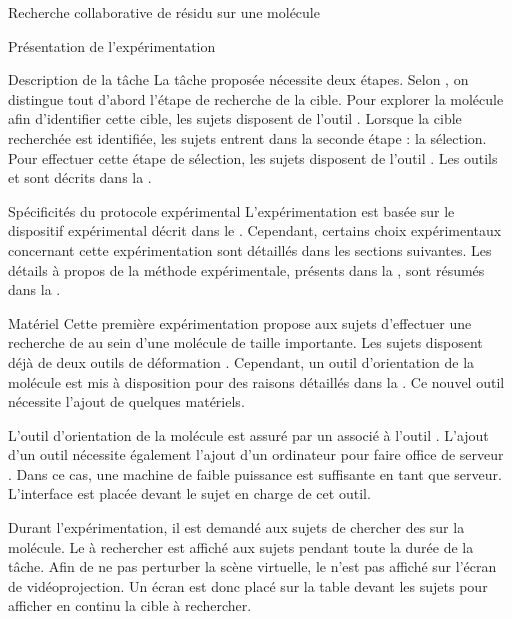 \documentclass[myfrancais]{mythesis}
\begin{document}
\begin{mychapter}{Recherche collaborative de résidu sur une molécule}
\begin{mysection}{Présentation de l'expérimentation}
\begin{mysubsection}{Description de la tâche}
				La tâche proposée nécessite deux étapes.
				Selon , on distingue tout d'abord l'étape de recherche de la cible.
				Pour explorer la molécule afin d'identifier cette cible, les sujets disposent de l'outil .
				Lorsque la cible recherchée est identifiée, les sujets entrent dans la seconde étape : la sélection.
				Pour effectuer cette étape de sélection, les sujets disposent de l'outil .
				Les outils  et  sont décrits dans la .
			\end{mysubsection}
			\begin{mysubsection}{Spécificités du protocole expérimental}
				L'expérimentation est basée sur le dispositif expérimental décrit dans le .
				Cependant, certains choix expérimentaux concernant cette expérimentation sont détaillés dans les sections suivantes.
				Les détails à propos de la méthode expérimentale, présents dans la , sont résumés dans la .
				\begin{mysubsubsection}[sss-exp1-Materiel]{Matériel}
					Cette première expérimentation propose aux sujets d'effectuer une recherche de  au sein d'une molécule de taille importante.
					Les sujets disposent déjà de deux outils de déformation .
					Cependant, un outil d'orientation de la molécule est mis à disposition pour des raisons détaillés dans la .
					Ce nouvel outil nécessite l'ajout de quelques matériels.

					L'outil d'orientation de la molécule est assuré par un \myOmni associé à l'outil  .
					L'ajout d'un outil nécessite également l'ajout d'un ordinateur pour faire office de serveur .
					Dans ce cas, une machine de faible puissance est suffisante en tant que serveur.
					L'interface est placée devant le sujet en charge de cet outil.

					Durant l'expérimentation, il est demandé aux sujets de chercher des  sur la molécule.
					Le  à rechercher est affiché aux sujets pendant toute la durée de la tâche.
					Afin de ne pas perturber la scène virtuelle, le  n'est pas affiché sur l'écran de vidéoprojection.
					Un écran \myLCD {} est donc placé sur la table devant les sujets pour afficher en continu la cible à rechercher.


\end{mysubsubsection}
\end{mysubsection}
\end{mysection}
\end{mychapter}
\end{document}
